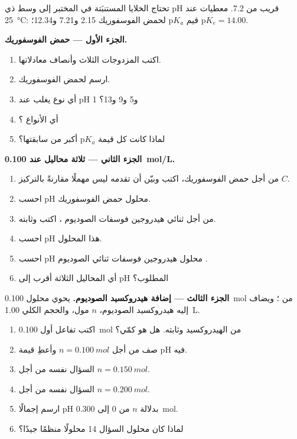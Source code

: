 \begin{problem}
\label{pb:b1:predominant-reaction:1}
تحتاج الخلايا المستنبَتة في المختبر إلى وسط ذي pH قريب من 7.2. معطيات عند
\qty{25}{\celsius}: قيم $\mathrm{p}K_a$ لحمض الفوسفوريك 2.15 و7.21
و12.34؛ $\mathrm{p}K_e = 14.00$.

\medskip
\noindent\textbf{الجزء الأول --- حمض الفوسفوريك.}
\begin{enumerate}
  \item اكتب المزدوجات الثلاث وأنصاف معادلاتها.
  \item ارسم  لحمض الفوسفوريك.
  \item أي نوع يغلب عند pH 1 و5 و9 و13؟
  \item أي الأنواع ؟
  \item لماذا كانت كل قيمة $\mathrm{p}K_a$ أكبر من سابقتها؟
\end{enumerate}

\medskip
\noindent\textbf{الجزء الثاني --- ثلاثة محاليل عند \qty{0.100}{mol/L}.}
\begin{enumerate}[resume]
  \item من أجل حمض الفوسفوريك، اكتب  وبيّن أن
        تقدمه ليس مهملًا مقارنةً بالتركيز $C$.
  \item احسب pH محلول حمض الفوسفوريك.
  \item من أجل ثنائي هيدروجين فوسفات الصوديوم ، اكتب  وثابته.
  \item احسب pH هذا المحلول.
  \item احسب pH محلول هيدروجين فوسفات ثنائي الصوديوم
        .
  \item أي المحاليل الثلاثة أقرب إلى pH المطلوب؟
\end{enumerate}

\medskip
\noindent\textbf{الجزء الثالث --- إضافة هيدروكسيد الصوديوم.}
يحوي محلول \qty{0.100}{mol} من ؛ ويضاف إليه هيدروكسيد الصوديوم،
$n$ مول، والحجم الكلي \qty{1.00}{L}.
\begin{enumerate}[resume]
  \item اكتب تفاعل أول \qty{0.100}{mol} من الهيدروكسيد
        وثابته. هل هو كمّي؟
  \item صف  من أجل $n = \qty{0.100}{mol}$ وأعطِ
        قيمة pH فيه.
  \item السؤال نفسه من أجل $n = \qty{0.150}{mol}$.
  \item السؤال نفسه من أجل $n = \qty{0.200}{mol}$.
  \item ارسم إجمالًا pH بدلالة $n$ من 0 إلى \qty{0.300}{mol}.
  \item لماذا كان محلول السؤال 14 محلولًا منظمًا جيدًا؟
\end{enumerate}


\end{problem}
